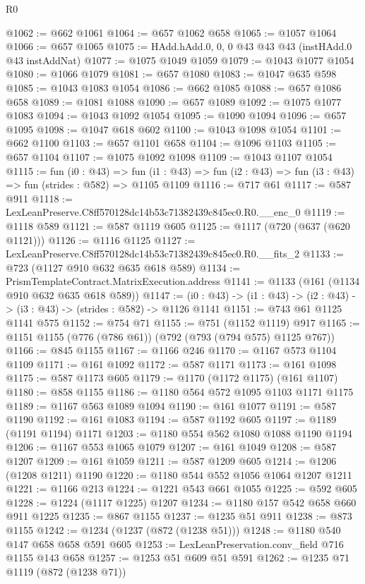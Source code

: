 \begin{lexlean}{R0}
\begin{coremodule}
@1062 := @662 @1061
@1064 := @657 @1062 @658
@1065 := @1057 @1064
@1066 := @657 @1065
@1075 := HAdd.hAdd.{0, 0, 0} @43 @43 @43 (instHAdd.{0} @43 instAddNat)
@1077 := @1075 @1049 @1059
@1079 := @1043 @1077 @1054
@1080 := @1066 @1079
@1081 := @657 @1080
@1083 := @1047 @635 @598
@1085 := @1043 @1083 @1054
@1086 := @662 @1085
@1088 := @657 @1086 @658
@1089 := @1081 @1088
@1090 := @657 @1089
@1092 := @1075 @1077 @1083
@1094 := @1043 @1092 @1054
@1095 := @1090 @1094
@1096 := @657 @1095
@1098 := @1047 @618 @602
@1100 := @1043 @1098 @1054
@1101 := @662 @1100
@1103 := @657 @1101 @658
@1104 := @1096 @1103
@1105 := @657 @1104
@1107 := @1075 @1092 @1098
@1109 := @1043 @1107 @1054
@1115 := fun (i0 : @43) =>
  fun (i1 : @43) => fun (i2 : @43) => fun (i3 : @43) => fun (strides : @582) => @1105 @1109
@1116 := @717 @61
@1117 := @587 @911
@1118 := LexLeanPreserve.C8ff570128dc14b53c71382439c845ec0.R0.__enc_0
@1119 := @1118 @589
@1121 := @587 @1119 @605
@1125 := @1117 (@720 (@637 (@620 @1121)))
@1126 := @1116 @1125
@1127 := LexLeanPreserve.C8ff570128dc14b53c71382439c845ec0.R0.__fits_2
@1133 := @723 (@1127 @910 @632 @635 @618 @589)
@1134 := PrismTemplateContract.MatrixExecution.address
@1141 := @1133 (@161 (@1134 @910 @632 @635 @618 @589))
@1147 := (i0 : @43) -> (i1 : @43) -> (i2 : @43) -> (i3 : @43) -> (strides : @582) -> @1126 @1141
@1151 := @743 @61 @1125 @1141 @575
@1152 := @754 @71
@1155 := @751 (@1152 @1119) @917
@1165 := @1151 @1155 (@776 (@786 @61)) (@792 (@793 (@794 @575) @1125 @767))
@1166 := @845 @1155
@1167 := @1166 @246
@1170 := @1167 @573 @1104 @1109
@1171 := @161 @1092
@1172 := @587 @1171
@1173 := @161 @1098
@1175 := @587 @1173 @605
@1179 := @1170 (@1172 @1175) (@161 @1107)
@1180 := @858 @1155
@1186 := @1180 @564 @572 @1095 @1103 @1171 @1175
@1189 := @1167 @563 @1089 @1094
@1190 := @161 @1077
@1191 := @587 @1190
@1192 := @161 @1083
@1194 := @587 @1192 @605
@1197 := @1189 (@1191 @1194) @1171
@1203 := @1180 @554 @562 @1080 @1088 @1190 @1194
@1206 := @1167 @553 @1065 @1079
@1207 := @161 @1049
@1208 := @587 @1207
@1209 := @161 @1059
@1211 := @587 @1209 @605
@1214 := @1206 (@1208 @1211) @1190
@1220 := @1180 @544 @552 @1056 @1064 @1207 @1211
@1221 := @1166 @213
@1224 := @1221 @543 @661 @1055
@1225 := @592 @605
@1228 := @1224 (@1117 @1225) @1207
@1234 := @1180 @157 @542 @658 @660 @911 @1225
@1235 := @867 @1155
@1237 := @1235 @51 @911
@1238 := @873 @1155
@1242 := @1234 (@1237 (@872 (@1238 @51)))
@1248 := @1180 @540 @147 @658 @658 @591 @605
@1253 := LexLeanPreservation.conv_field @716 @1155 @143 @658
@1257 := @1253 @51 @609 @51 @591
@1262 := @1235 @71 @1119 (@872 (@1238 @71))

\end{coremodule}
\end{lexlean}
